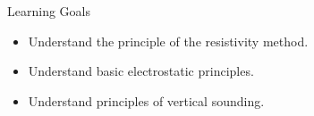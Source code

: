 \begin{frame}
  \begin{PointSix}{Learning Goals}
    \begin{itemize}
      \item \alert{Understand the principle of the resistivity method.}
      \item \alert{Understand basic electrostatic principles.}
      \item \alert{Understand principles of vertical sounding.}
    \end{itemize}
  \end{PointSix}
\end{frame}